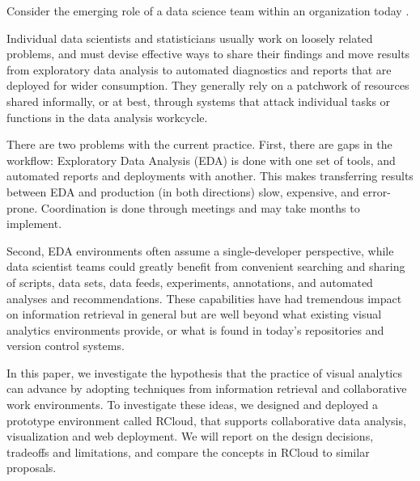 

\maketitle


Consider the emerging role of a data science team within an
organization today \cite{Keim:2008:VAS}.

Individual data scientists and statisticians usually work on loosely
related problems, and must devise effective ways to share their findings
and move results from exploratory data analysis to automated diagnostics
and reports that are deployed for wider consumption.
They generally rely on a patchwork of resources shared informally,
or at best, through systems that attack individual tasks or functions
in the data analysis workcycle. %

There are two problems with the current
practice. First, there are gaps in the workflow:
Exploratory Data Analysis (EDA) is done with one set of tools,
and automated reports and deployments with another. This makes
transferring results between EDA and production (in both directions)
slow, expensive, and error-prone. Coordination is done through
meetings and may take months to implement.

Second, EDA environments often assume a single-developer perspective,
while data scientist teams could greatly benefit from convenient searching
and sharing of scripts, data sets, data feeds, experiments, annotations,
and automated analyses and recommendations. These capabilities have had
tremendous impact on information retrieval in general but are well
beyond what existing visual analytics environments provide, or what
is found in today's repositories and version control systems.

 In this paper, we investigate the hypothesis
that the practice of visual analytics can advance by adopting techniques
from information retrieval and collaborative work environments. To investigate
these ideas, we designed and deployed a prototype environment called RCloud,
that supports collaborative data analysis, visualization and web deployment.
We will report on the design decisions, tradeoffs and limitations, and compare
the concepts in RCloud to similar proposals.

